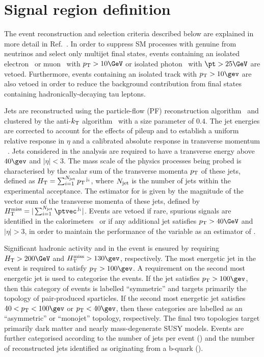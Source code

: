 \section{Signal region definition}
\label{sec:event_selection}

The event reconstruction and selection criteria described below are
explained in more detail in Ref.~\cite{RA1Paper2012}. In order to
suppress SM processes with genuine \ptvecmiss from neutrinos and select
only multijet final states, events containing an isolated
electron~\cite{PAS-EGM-10-004} or muon~\cite{PAS-MUO-10-004} with $\Pt
> 10\GeV$ or isolated photon~\cite{PAS-EGM-10-006} with $\pt > 25\GeV$
are vetoed. Furthermore, events containing an isolated track with $\Pt
> 10\gev$ are also vetoed in order to reduce the background
contribution from final states containing hadronically-decaying tau
leptons.

Jets are reconstructed using the particle-flow (PF) reconstruction
algorithm~\cite{CMS-PAS-PFT-09-001, CMS-PAS-PFT-10-001} and clustered
by the anti-$k_{\rm T}$ algorithm~\cite{antikt} with a size parameter
of $0.4$. The jet energies are corrected to account for the effects of
pileup and to establish a uniform relative response in $\eta$ and a
calibrated absolute response in transverse momentum
\pt~\cite{2011arXiv1107.4277C}. Jets considered in the analysis are
required to have a transverse energy above $40\gev$ and $|\eta| <
3$. The mass scale of the physics processes being probed is
characterised by the scalar sum of the transverse momenta ${p_{\text T}}$ of
these jets, defined as $H_{\mathrm{T}} = \sum_{i=1}^{N_{\rm jet}}
{p_{\text T}}^{\,\mathrm{j}_i}$, where $N_{\rm jet}$ is the number of jets
within the experimental acceptance. The estimator for \ETmiss is given
by the magnitude of the vector sum of the transverse momenta of these
jets, defined by $\mht = |\sum_{i=1}^{N_\text{jet}}
\ptvec^{\,\mathrm{j}_i}|$. Events are vetoed if rare, spurious signals
are identified in the calorimeters~\cite{1748-0221-5-03-T03014,
  CMS-NOTE-2010-012} or if any additional jet satisfies $\Pt > 40\GeV$
and $|\eta| > 3$, in order to maintain the performance of the variable
\mht as an estimator of \ETmiss.

Significant hadronic activity and \ETmiss in the event is ensured by
requiring $\scalht > 200\GeV$ and $\mht > 130\gev$, respectively. The
most energetic jet in the event is required to satisfy $\Pt >
100\gev$. A requirement on the second most energetic jet is used to
categorise the events. If the jet satisfies $\Pt > 100\gev$, then this
category of events is labelled ``symmetric'' and targets primarily the
topology of pair-produced sparticles. If the second most energetic jet
satisfies $40 < \Pt < 100\gev$ or $\Pt < 40\gev$, then these
categories are labelled as an ``asymmetric'' or ``monojet'' topology,
respectively. The final two topologies target primarily dark matter
and nearly mass-degenerate SUSY models. Events are further categorised
according to the number of jets per event (\njet) and the number of
reconstructed jets identified as originating from a b-quark (\nb).

